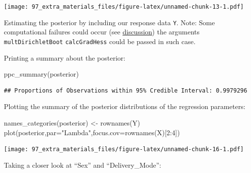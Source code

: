 \documentclass[
]{book}
\newenvironment{Shaded}{\begin{snugshade}}{\end{snugshade}}
\newcommand{\AttributeTok}[1]{\textcolor[rgb]{0.77,0.63,0.00}{#1}}
\newcommand{\CommentTok}[1]{\textcolor[rgb]{0.56,0.35,0.01}{\textit{#1}}}
\newcommand{\DecValTok}[1]{\textcolor[rgb]{0.00,0.00,0.81}{#1}}
\newcommand{\FloatTok}[1]{\textcolor[rgb]{0.00,0.00,0.81}{#1}}
\newcommand{\FunctionTok}[1]{\textcolor[rgb]{0.00,0.00,0.00}{#1}}
\newcommand{\NormalTok}[1]{#1}
\newcommand{\OtherTok}[1]{\textcolor[rgb]{0.56,0.35,0.01}{#1}}
\newcommand{\SpecialCharTok}[1]{\textcolor[rgb]{0.00,0.00,0.00}{#1}}
\newcommand{\StringTok}[1]{\textcolor[rgb]{0.31,0.60,0.02}{#1}}
\begin{document}
\texttt{[image: 97\_extra\_materials\_files/figure-latex/unnamed-chunk-13-1.pdf]}

Estimating the posterior by including our response data \texttt{Y}.
Note: Some computational failures could occur (see \href{https://github-wiki-see.page/m/jsilve24/fido/wiki/Frequently-Asked-Questions}{discussion})
the arguments \texttt{multDirichletBoot} \texttt{calcGradHess} could be passed in such case.

\begin{Shaded}
\end{Shaded}

Printing a summary about the posterior:

\begin{Shaded}
\begin{Highlighting}[]
\FunctionTok{ppc\_summary}\NormalTok{(posterior)}
\end{Highlighting}
\end{Shaded}

\begin{verbatim}
## Proportions of Observations within 95% Credible Interval: 0.9979296
\end{verbatim}

Plotting the summary of the posterior distributions of the regression parameters:

\begin{Shaded}
\begin{Highlighting}[]
\FunctionTok{names\_categories}\NormalTok{(posterior) }\OtherTok{\textless{}{-}} \FunctionTok{rownames}\NormalTok{(Y)}
\FunctionTok{plot}\NormalTok{(posterior,}\AttributeTok{par=}\StringTok{"Lambda"}\NormalTok{,}\AttributeTok{focus.cov=}\FunctionTok{rownames}\NormalTok{(X)[}\DecValTok{2}\SpecialCharTok{:}\DecValTok{4}\NormalTok{])}
\end{Highlighting}
\end{Shaded}

\texttt{[image: 97\_extra\_materials\_files/figure-latex/unnamed-chunk-16-1.pdf]}

Taking a closer look at ``Sex'' and ``Delivery\_Mode'':
\end{document}
